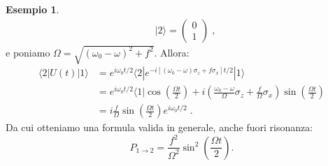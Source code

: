 \documentclass[12pt,a4paper]{report}
\theoremstyle{definition}
\newtheorem{exm}{Esempio}
\numberwithin{equation}{section}
\newcommand{\bra}{\langle}
\newcommand{\ket}{\rangle}
\begin{document}
\begin{exm}
\begin{align*}
&|2\ket=\begin{pmatrix}
0 \\
1
\end{pmatrix}\;,
\end{align*}
e poniamo $\Omega=\sqrt{(\omega_0-\omega)^2+f^2}$. Allora:
\begin{align*}
\bra 2|U(t)|1\ket &= e^{i\omega_0t/2}\bra 2|e^{-i[(\omega_0-\omega)\sigma_z+f\sigma_x]t/2}|1\ket \\
&= e^{i\omega_0t/2}\bra 1|\cos\left(\frac{\Omega t}{2}\right)+i\left(\frac{\omega_0-\omega}{\Omega}\sigma_z+\frac{f}{\Omega}\sigma_x\right)\sin\left(\frac{\Omega t}{2}\right) \\
&= i\frac{f}{\Omega}\sin\left(\frac{\Omega t}{2}\right)e^{i\omega_0t/2}\;.
\end{align*}
Da cui otteniamo una formula valida in generale, anche fuori risonanza:
\begin{equation}
P_{1\to 2}=\frac{f^2}{\Omega^2}\sin^2\left(\frac{\Omega t}{2}\right).
\end{equation}
\end{exm}
\end{document}
